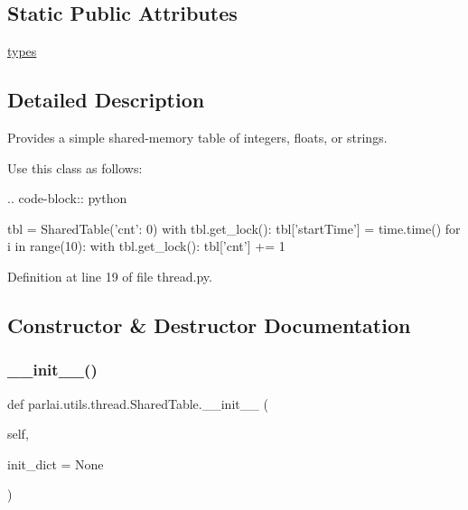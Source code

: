 \subsection*{Static Public Attributes}
\begin{DoxyCompactItemize}
\item 
\hyperlink{classparlai_1_1utils_1_1thread_1_1SharedTable_afd2aec148b1e66d0496f137749862e58}{types}
\end{DoxyCompactItemize}


\subsection{Detailed Description}
\begin{DoxyVerb}Provides a simple shared-memory table of integers, floats, or strings.

Use this class as follows:

.. code-block:: python

    tbl = SharedTable({'cnt': 0})
    with tbl.get_lock():
        tbl['startTime'] = time.time()
    for i in range(10):
        with tbl.get_lock():
            tbl['cnt'] += 1
\end{DoxyVerb}
 

Definition at line 19 of file thread.\+py.



\subsection{Constructor \& Destructor Documentation}
\mbox{\label{classparlai_1_1utils_1_1thread_1_1SharedTable_a52b58b8d6ad0ba31cf2e3236afe970a5}} 
\subsubsection{\texorpdfstring{\+\_\+\+\_\+init\+\_\+\+\_\+()}{\_\_init\_\_()}}
{\footnotesize\ttfamily def parlai.\+utils.\+thread.\+Shared\+Table.\+\_\+\+\_\+init\+\_\+\+\_\+ (\begin{DoxyParamCaption}\item[{}]{self,  }\item[{}]{init\+\_\+dict = {\ttfamily None} }\end{DoxyParamCaption})}

